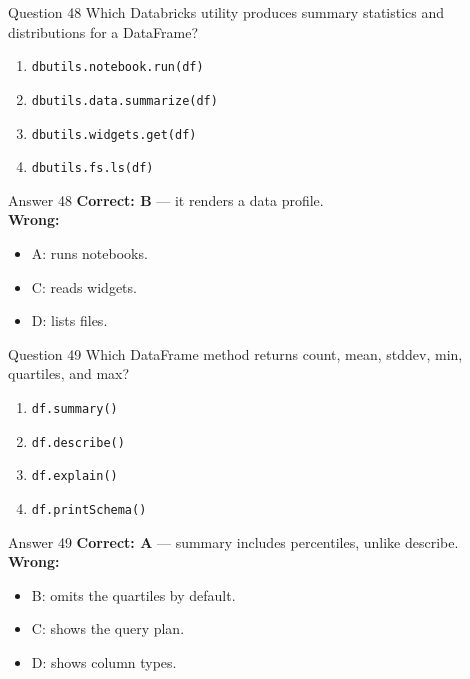 \documentclass[aspectratio=169,11pt]{beamer}
\begin{document}
	\begin{frame}{Question 48}
		Which Databricks utility produces summary statistics and distributions for a DataFrame?
		\begin{enumerate}[label=\Alph*.]
			\item \texttt{dbutils.notebook.run(df)}
			\item \texttt{dbutils.data.summarize(df)}
			\item \texttt{dbutils.widgets.get(df)}
			\item \texttt{dbutils.fs.ls(df)}
		\end{enumerate}
	\end{frame}
	\begin{frame}{Answer 48}
		\textbf{Correct: B} --- it renders a data profile.\\
		\vspace{0.5em}
		\textbf{Wrong:}
		\begin{itemize}
			\item A: runs notebooks.
			\item C: reads widgets.
			\item D: lists files.
		\end{itemize}
	\end{frame}
	
	\begin{frame}{Question 49}
		Which DataFrame method returns count, mean, stddev, min, quartiles, and max?
		\begin{enumerate}[label=\Alph*.]
			\item \texttt{df.summary()}
			\item \texttt{df.describe()}
			\item \texttt{df.explain()}
			\item \texttt{df.printSchema()}
		\end{enumerate}
	\end{frame}
	\begin{frame}{Answer 49}
		\textbf{Correct: A} --- summary includes percentiles, unlike describe.\\
		\vspace{0.5em}
		\textbf{Wrong:}
		\begin{itemize}
			\item B: omits the quartiles by default.
			\item C: shows the query plan.
			\item D: shows column types.
		\end{itemize}
	\end{frame}
	
\end{document}
